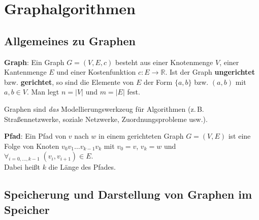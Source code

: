 \section{%
    Graphalgorithmen%
}

\subsection{%
    Allgemeines zu Graphen%
}

\textbf{Graph}:
Ein Graph $G = (V, E, c)$ besteht aus einer Knotenmenge $V$,
einer Kantenmenge $E$ und einer Kostenfunktion $c: E \rightarrow \mathbb{R}$.
Ist der Graph \textbf{ungerichtet} bzw. \textbf{gerichtet},
so sind die Elemente von $E$ der Form $\{a, b\}$ bzw. $(a, b)$ mit
$a, b \in V$.
Man legt $n = |V|$ und $m = |E|$ fest.

Graphen sind \emph{das} Modellierungswerkzeug für Algorithmen
(z.\,B. Straßennetzwerke, soziale Netzwerke, Zuordnungsprobleme usw.).

\textbf{Pfad}:
Ein Pfad von $v$ nach $w$ in einem gerichteten Graph $G = (V, E)$
ist eine Folge von Knoten $v_0 v_1 \dotsc v_{k-1} v_k$ mit
$v_0 = v$, $v_k = w$ und $\forall_{i=0,\dotsc,k-1}\; (v_i, v_{i+1}) \in E$. \\
Dabei heißt $k$ die Länge des Pfades.

\subsection{%
    Speicherung und Darstellung von Graphen im Speicher%
}

